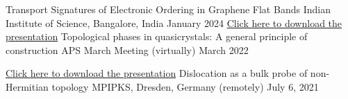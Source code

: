 \begin{cventries}
	{Transport Signatures of Electronic	Ordering in Graphene Flat Bands} %
	{Indian Institute of Science, Bangalore, India} %
	{January 2024} %
	{
	}
	\vspace{-1.5mm}
  \cventry
    {\href{https://drive.google.com/file/d/1HrlFGdNeFf5c6VuSyOaXjgsDxlA-f_bh/view?usp=sharing}{Click \underline{here} to download the presentation}} %
    {Topological phases in quasicrystals: A general principle of construction} %
    {APS March Meeting (virtually)} %
    {March 2022} %
    {
    }
	\vspace{-1.5mm}

  \cventry
	{\href{https://drive.google.com/file/d/18EtxINc68yc_Dt_sxsVkAIQNs8viJxYq/view?usp=sharing}{Click \underline{here} to download the presentation}} %
	{Dislocation as a bulk probe of non-Hermitian topology} %
	{MPIPKS, Dresden, Germany (remotely)} %
	{July 6, 2021} %
	{
	}
\end{cventries}

